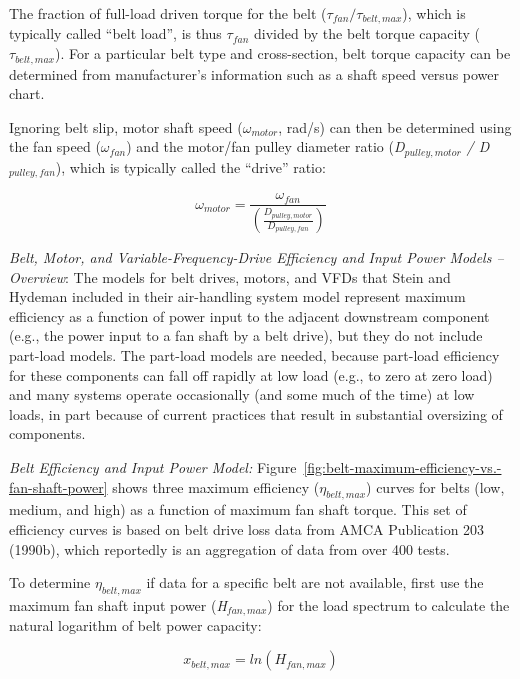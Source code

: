 The fraction of full-load driven torque for the belt (\(\tau_{fan} / \tau_{belt,max}\)), which is typically called ``belt load'', is thus \emph{\(\tau_{fan}\)} divided by the belt torque capacity (\(\tau_{belt,max}\)). For a particular belt type and cross-section, belt torque capacity can be determined from manufacturer's information such as a shaft speed versus power chart.

Ignoring belt slip, motor shaft speed (\(\omega_{motor}\), rad/s) can then be determined using the fan speed (\(\omega_{fan}\)) and the motor/fan pulley diameter ratio (\emph{D\(_{pulley,motor}\) / D\(_{pulley,fan}\)}), which is typically called the ``drive'' ratio:

\begin{equation}
{\omega_{motor}} = \frac{{{\omega_{fan}}}}{{\left( {\frac{{{D_{pulley,motor}}}}{{{D_{pulley,fan}}}}} \right)}}
\end{equation}

\emph{Belt, Motor, and Variable-Frequency-Drive Efficiency and Input Power Models -- Overview}: The models for belt drives, motors, and VFDs that Stein and Hydeman included in their air-handling system model represent maximum efficiency as a function of power input to the adjacent downstream component (e.g., the power input to a fan shaft by a belt drive), but they do not include part-load models. The part-load models are needed, because part-load efficiency for these components can fall off rapidly at low load (e.g., to zero at zero load) and many systems operate occasionally (and some much of the time) at low loads, in part because of current practices that result in substantial oversizing of components.

\emph{Belt Efficiency and Input Power Model:} Figure~\ref{fig:belt-maximum-efficiency-vs.-fan-shaft-power} shows three maximum efficiency (\(\eta_{belt,max}\)) curves for belts (low, medium, and high) as a function of maximum fan shaft torque. This set of efficiency curves is based on belt drive loss data from AMCA Publication 203 (1990b), which reportedly is an aggregation of data from over 400 tests.

To determine \(\eta_{belt,max}\) if data for a specific belt are not available, first use the maximum fan shaft input power (\emph{H\(_{fan,max}\)}) for the load spectrum to calculate the natural logarithm of belt power capacity:

\begin{equation}
x_{belt,max} = ln({H_{fan,max}})
\end{equation}

